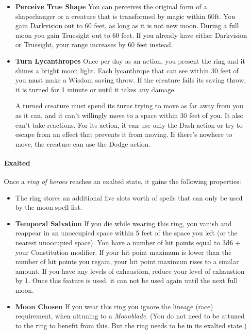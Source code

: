 \documentclass[letter,10pt,twocolumn,openany]{dndbook}
\begin{document}
\begin{itemize}
    \item \textbf{Perceive True Shape}
    You can perceives the original form of a shapechanger or a creature that is transformed by magic within 60ft.
    You gain Darkvision out to 60 feet, as long as it is not new moon.
    During a full moon you gain Truesight out to 60 feet.
    If you already have either Darkvision or Truesight, your range increases by 60 feet instead.
    \item \textbf{Turn Lycanthropes}
    Once per day as an action, you present the ring and it shines a bright moon light.
    Each lycanthrope that can see within 30 feet of you must make a Wisdom saving throw.
    If the creature fails its saving throw, it is turned for 1 minute or until it takes any damage.

    A turned creature must spend its turns trying to move as far away from you as it can, and it can't willingly move to a space within 30 feet of you. It also can't take reactions. For its action, it can use only the Dash action or try to escape from an effect that prevents it from moving. If there's nowhere to move, the creature can use the Dodge action.
\end{itemize}


\paragraph{Exalted}
Once a \textit{ring of heroes} reaches an exalted state, it gains the following properties:

\begin{itemize}
    \item The ring stores an additional five slots worth of spells that can only be used by the moon spell list.
    \item \textbf{Temporal Salvation}
    If you die while wearing this ring, you vanish and reappear in an unoccupied space within 5 feet of the space you left (or the nearest unoccupied space).
    You have a number of hit points equal to 3d6 + your Constitution modifier.
    If your hit point maximum is lower than the number of hit points you regain, your hit point maximum rises to a similar amount.
    If you have any levels of exhaustion, reduce your level of exhaustion by 1.
    Once this feature is used, it can not be used again until the next full moon.
    \item \textbf{Moon Chosen}
    If you wear this ring you ignore the lineage (race) requirement, when attuning to a \textit{Moonblade}.
    (You do not need to be attuned to the ring to benefit from this.
    But the ring needs to be in its exalted state.)
\end{itemize}
\end{document}

